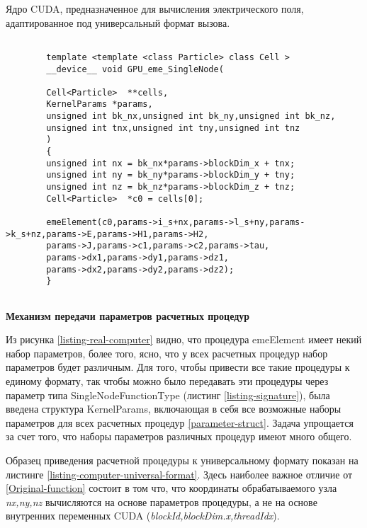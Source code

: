 \begin{ListingEnv}[!h]
	\captiondelim{ } %
	\caption{Ядро CUDA, предназначенное для вычисления электрического поля, адаптированное под универсальный формат вызова.}
	\label{parameter-struct1}	
	\begin{lstlisting}[language={[ISO]C++}]
	
		template <template <class Particle> class Cell >
		__device__ void GPU_eme_SingleNode(
		
		Cell<Particle>  **cells,
		KernelParams *params,
		unsigned int bk_nx,unsigned int bk_ny,unsigned int bk_nz,
		unsigned int tnx,unsigned int tny,unsigned int tnz
		)
		{
		unsigned int nx = bk_nx*params->blockDim_x + tnx;
		unsigned int ny = bk_ny*params->blockDim_y + tny;
		unsigned int nz = bk_nz*params->blockDim_z + tnz;
		Cell<Particle>  *c0 = cells[0];
		
		emeElement(c0,params->i_s+nx,params->l_s+ny,params->k_s+nz,params->E,params->H1,params->H2,
		params->J,params->c1,params->c2,params->tau,
		params->dx1,params->dy1,params->dz1,
		params->dx2,params->dy2,params->dz2);
		}
	
	\end{lstlisting}
	\label{listing-computer-universal-format}
\end{ListingEnv}

\textbf{Механизм передачи параметров расчетных процедур}


Из рисунка \ref{listing-real-computer} видно, что процедура emeElement имеет некий набор параметров, более того, ясно, что у всех расчетных процедур набор параметров будет различным. Для
того, чтобы привести все такие процедуры к единому формату, так чтобы можно было передавать эти процедуры через параметр типа SingleNodeFunctionType (листинг \ref{listing-signature}), была введена структура KernelParams, включающая в себя все возможные наборы параметров для всех расчетных процедур \ref{parameter-struct}. Задача упрощается за счет того, что наборы параметров различных процедур имеют много общего. 

Образец приведения расчетной процедуры к универсальному формату показан на листинге \ref{listing-computer-universal-format}. Здесь наиболее важное отличие от \ref{Original-function} состоит в том что, что координаты обрабатываемого узла \textit{nx,ny,nz} вычисляются на основе параметров процедуры, а не на основе внутренних переменных CUDA (\textit{blockId,blockDim.x,threadIdx}).

